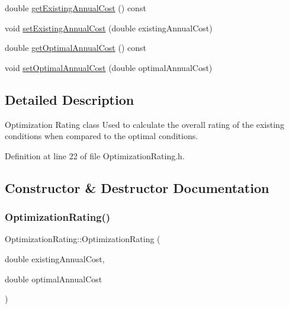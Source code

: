 \begin{DoxyCompactItemize}
\item 
double \hyperlink{class_optimization_rating_ac6e84aa94642911d089e464aae749ffe}{get\+Existing\+Annual\+Cost} () const
\item 
void \hyperlink{class_optimization_rating_a167d4626ab234baf7facce5fe8e4b32d}{set\+Existing\+Annual\+Cost} (double existing\+Annual\+Cost)
\item 
double \hyperlink{class_optimization_rating_ada9718f5369be2b14b4b0c07d4fa9510}{get\+Optimal\+Annual\+Cost} () const
\item 
void \hyperlink{class_optimization_rating_a4651985a899b2bff18e8356a42c2d37f}{set\+Optimal\+Annual\+Cost} (double optimal\+Annual\+Cost)
\end{DoxyCompactItemize}


\subsection{Detailed Description}
Optimization Rating class Used to calculate the overall rating of the existing conditions when compared to the optimal conditions. 

Definition at line 22 of file Optimization\+Rating.\+h.



\subsection{Constructor \& Destructor Documentation}
\mbox{\label{class_optimization_rating_a775f099775418ff79ae82091f7867c5c}} 
\subsubsection{\texorpdfstring{Optimization\+Rating()}{OptimizationRating()}\hspace{0.1cm}{\footnotesize\ttfamily [1/3]}}
{\footnotesize\ttfamily Optimization\+Rating\+::\+Optimization\+Rating (\begin{DoxyParamCaption}\item[{double}]{existing\+Annual\+Cost,  }\item[{double}]{optimal\+Annual\+Cost }\end{DoxyParamCaption})\hspace{0.3cm}{\ttfamily [inline]}}

